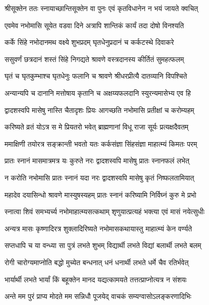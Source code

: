 \twolineshloka
{श्रीसूक्तेन ततः स्नायाच्छान्तिसूक्तेन वा पुनः}
{एवं कृतविधानेन न भयं जायते क्वचित्} %

\twolineshloka
{एवमेव नभोमासि सूयेत वडवा दिने}
{अत्रापि शान्तिकं कार्यं तदा दोषो विनश्यति} %

\twolineshloka
{कर्के सिंहे नभोदानमथ वक्ष्ये शुभप्रदम्}
{घृतधेनुप्रदानं च कर्कटस्थे दिवाकरे} %

\twolineshloka
{ससुवर्णं छत्रदानं शस्तं सिंहे निगद्यते}
{श्रावणे वस्त्रदानस्य कीर्तितं सुमहत्फलम्} %

\twolineshloka
{घृतं च घृतकुम्भाश्च घृतधेनुः फलानि च}
{श्रावणे श्रीधरप्रीत्यै दातव्यानि विपश्चिते} %

\twolineshloka
{अन्यान्यपि च दानानि मत्तोषाय कृतानि च}
{अक्षय्यफलदानि स्युरन्यमासेभ्य एव हि} %

\twolineshloka
{द्वादशस्वपि मासेषु नास्ति चैतादृशः प्रियः}
{आगच्छति नभोमासि प्रतीक्षां च करोम्यहम्} %

\twolineshloka
{करिष्यते व्रतं योऽत्र स मे प्रियतरो भवेत्}
{ब्राह्मणानां विधू राजा सूर्यः प्रत्यक्षदैवतम्} %

\twolineshloka
{ममाक्षिणी तयोरत्र सङ्क्रान्ती भवतो यतः}
{कर्कसंज्ञा सिंहसंज्ञा माहात्म्यं किमतः परम्} %

\twolineshloka
{प्रातः स्नानं मासमात्रमत्र यः कुरुते नरः}
{द्वादशस्वपि मासेषु प्रातः स्नानफलं लभेत्} %

\twolineshloka
{न करोति नभोमासि प्रातः स्नानं यदा नरः}
{द्वादशस्वपि मासेषु कृतं निष्फलतामियात्} %

\twolineshloka
{महादेव दयासिन्धो श्रावणे मास्युषस्यहम्}
{प्रातः स्नानं करिष्यामि निर्विघ्नं कुरु मे प्रभो} %

\twolineshloka
{स्नात्वा शिवं समभ्यर्च्य नभोमाहात्म्यसत्कथाम्}
{शृणुयात्प्रत्यहं भक्त्या एवं मासं नयेत्सुधीः} %

\twolineshloka
{अन्यत्र मासः कृष्णादिरत्र शुक्लादिरिष्यते}
{नभोमासकथायास्तु माहात्म्यं केन वर्ण्यते} %

\twolineshloka
{सप्तधापि च या वन्ध्या सा पुत्रं लभते शुभम्}
{विद्यार्थी लभते विद्यां बलार्थी लभते बलम्} %

\twolineshloka
{रोगी चारोग्यमाप्नोति बद्धो मुच्येत बन्धनात्}
{धनं धनार्थी लभते धर्मे चैव रतिर्भवेत्} %

\twolineshloka
{भार्यार्थी लभते भार्यां किं बहूक्तेन मानद}
{यद्यत्कामयते तत्तत्प्राप्नोत्यत्र न संशयः} %

\twolineshloka
{अन्ते मम पुरं प्राप्य मोदते मम सन्निधौ}
{पूजयेद् वाचकं सम्यग्वासोऽलङ्करणादिभिः} %

